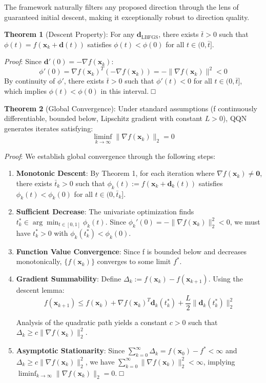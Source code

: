 The framework naturally filters any proposed direction through the lens of guaranteed initial descent, making it exceptionally robust to direction quality.

\textbf{Theorem 1} (Descent Property): For any \(\mathbf{d}_{\text{LBFGS}}\), there exists \(\bar{t} > 0\) such that \(\phi(t) = f(\mathbf{x}_k + \mathbf{d}(t))\) satisfies \(\phi(t) < \phi(0)\) for all \(t \in (0, \bar{t}]\).

\emph{Proof}: Since \(\mathbf{d}'(0) = -\nabla f(\mathbf{x}_k)\):
\[\phi'(0) = \nabla f(\mathbf{x}_k)^T (-\nabla f(\mathbf{x}_k)) = -\|\nabla f(\mathbf{x}_k)\|^2 < 0\]
By continuity of \(\phi'\), there exists \(\bar{t} > 0\) such that \(\phi'(t) < 0\) for all \(t \in (0, \bar{t}]\), which implies \(\phi(t) < \phi(0)\) in this interval. □

\textbf{Theorem 2} (Global Convergence): Under standard assumptions (f continuously differentiable, bounded below, Lipschitz
gradient with constant \(L > 0\)), QQN generates iterates satisfying:
\[\liminf_{k \to \infty} \|\nabla f(\mathbf{x}_k)\|_2 = 0\]

\emph{Proof}: We establish global convergence through the following steps:

\begin{enumerate}
\def\labelenumi{\arabic{enumi}.}
\item
  \textbf{Monotonic Descent}: By Theorem 1, for each iteration where \(\nabla f(\mathbf{x}_k) \neq \mathbf{0}\), there exists \(\bar{t}_k > 0\) such that \(\phi_k(t) := f(\mathbf{x}_k + \mathbf{d}_k(t))\) satisfies \(\phi_k(t) < \phi_k(0)\) for all \(t \in (0, \bar{t}_k]\).
\item
  \textbf{Sufficient Decrease}: The univariate optimization finds \(t_k^* \in \arg\min_{t \in [0,1]} \phi_k(t)\).
  Since \(\phi_k'(0) = -\|\nabla f(\mathbf{x}_k)\|_2^2 < 0\), we must have \(t_k^* > 0\) with \(\phi_k(t_k^*) < \phi_k(0)\).
\item
  \textbf{Function Value Convergence}: Since f is bounded below and decreases monotonically, \(\{f(\mathbf{x}_k)\}\) converges to some limit \(f^*\).
\item
  \textbf{Gradient Summability}: Define \(\Delta_k := f(\mathbf{x}_k) - f(\mathbf{x}_{k+1})\). Using the descent lemma:
  \[f(\mathbf{x}_{k+1}) \leq f(\mathbf{x}_k) + \nabla f(\mathbf{x}_k)^T \mathbf{d}_k(t_k^*) + \frac{L}{2}\|\mathbf{d}_k(t_k^*)\|_2^2\]

  Analysis of the quadratic path yields a constant \(c > 0\) such that \(\Delta_k \geq c\|\nabla f(\mathbf{x}_k)\|_2^2\).
\item
  \textbf{Asymptotic Stationarity}: Since \(\sum_{k=0}^{\infty} \Delta_k = f(\mathbf{x}_0) - f^* < \infty\) and
  \(\Delta_k \geq c\|\nabla f(\mathbf{x}_k)\|_2^2\), we have \(\sum_{k=0}^{\infty} \|\nabla f(\mathbf{x}_k)\|_2^2 < \infty\),
  implying \(\liminf_{k \to \infty} \|\nabla f(\mathbf{x}_k)\|_2 = 0\). □
\end{enumerate}


